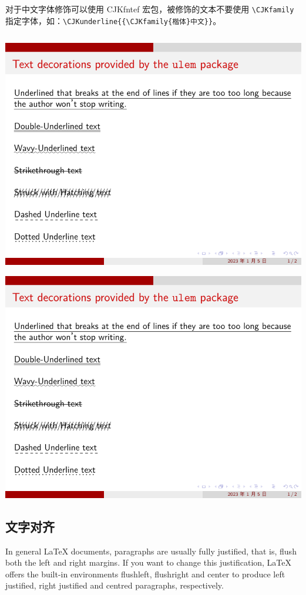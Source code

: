 对于中文字体修饰可以使用 CJKfntef 宏包，被修饰的文本不要使用 \verb|\CJKfamily| 指定字体，如：\verb|\CJKunderline{{\CJKfamily{楷体}中文}}|。

\inputminted[linenos=true]{latex}{examples/beamer/beamertextformat03.tex}

\includegraphics[page=1]{examples/beamer/beamertextformat03.pdf}

\includegraphics[page=2]{examples/beamer/beamertextformat03.pdf}

\subsection{文字对齐}

In general LaTeX documents, paragraphs are usually fully justified, that is, flush both the left and right margins. If you want to change this justification, LaTeX offers the built-in environments flushleft, flushright and center to produce left justified, right justified and centred paragraphs, respectively.

